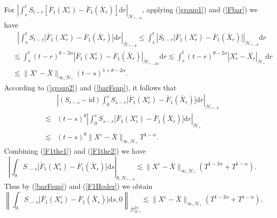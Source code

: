 \documentclass[10pt,a4paper]{article}
\numberwithin{equation}{section}
\begin{document}
For $ \left|\int_s^t S_{t-r} [\bar{F}_1(X_r^\varepsilon)-\bar{F}_1(\bar{X}_r) ] \mathrm{d} r \right|_{\mathcal H_{\gamma-\theta}}$, applying (\ref{group1}) and (\ref{Fbar}) we have
\begin{align}\label{F1the1}
&~~~\left|\int_s^t S_{t-r} \big[\bar{F}_1(X_r^\varepsilon)-\bar{F}_1(\bar{X}_r) \big] \mathrm{d} r \right|_{\mathcal H_{\gamma-\theta}}
\leq \int_s^t \left|S_{t-r} \big[\bar{F}_1(X_r^\varepsilon)-\bar{F}_1(\bar{X}_r) \big] \right|_{\mathcal H_{\gamma-\theta}}\mathrm{d} r \nonumber\\
& \lesssim  \int_s^t (t-r)^{\theta-2\alpha} \left|\bar{F}_1(X_r^\varepsilon)-\bar{F}_1(\bar{X}_r)\right|_{\mathcal H_{\gamma-2\alpha} }\mathrm{d} r
 \lesssim  \int_s^t (t-r)^{\theta-2\alpha} |X_r^\varepsilon-\bar{X}_r|_{\mathcal H_\gamma} \mathrm{d} r \nonumber\\
& \lesssim \|X^\varepsilon-\bar{X}\|_{\infty,\mathcal H_\gamma} (t-s)^{1+\theta-2\alpha}.
\end{align}
According to (\ref{group2}) and (\ref{barFsup}), it follows that
\begin{align} \label{F1the2}
& \left|(S_{t-s}-\mathrm{id} )\int_0^s S_{s-r} \big[\bar{F}_1(X_r^\varepsilon)-\bar{F}_1(\bar{X}_r) \big] \mathrm{d} r \right|_{\mathcal H_{\gamma-\theta}} \nonumber\\
\lesssim & (t-s)^\theta \left|\int_0^s S_{s-r} \big[\bar{F}_1(X_r^\varepsilon)-\bar{F}_1(\bar{X}_r) \big] \mathrm{d} r \right|_{\mathcal H_\gamma } \nonumber\\
\lesssim & (t-s)^\theta \|X^\varepsilon-\bar{X}\|_{\infty,\mathcal H_\gamma} T^{1-\alpha}.
\end{align}
Combining (\ref{F1the1}) and (\ref{F1the2}) we have
\begin{equation} \label{F1Hoder}
\left| \int_0^\cdot S_{\cdot-s} \big[\bar{F}_1(X_s^\varepsilon)-\bar{F}_1(\bar{X}_s) \big]\mathrm{d} s \right|_{\theta,\mathcal H_{\gamma-\theta}}
\lesssim \|X^\varepsilon-\bar{X}\|_{\infty,\mathcal H_\gamma} (T^{1-2\alpha}+T^{1-\alpha}).
\end{equation}
Thus by (\ref{barFsup}) and (\ref{F1Hoder}) we obtain
\begin{equation}\label{Frem}
\left\| \int_0^\cdot S_{\cdot-s} \big[\bar{F}_1(X_s^\varepsilon)-\bar{F}_1(\bar{X}_s) \big]\mathrm{d} s,0 \right\|_{\mathcal{D}_{ B,\gamma}^{2\alpha}}
\lesssim \|X^\varepsilon-\bar{X}\|_{\infty,\mathcal H_\gamma} (T^{1-2\alpha}+T^{1-\alpha}).
\end{equation}
\end{document}
